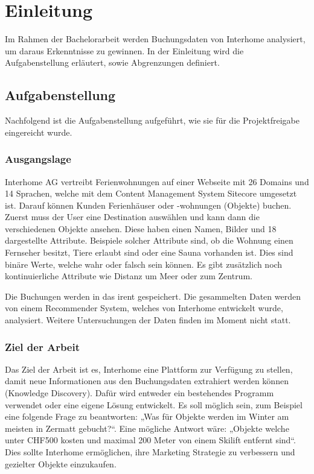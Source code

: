 
\chapter{Einleitung}
\label{sec:vorgehen}
Im Rahmen der Bachelorarbeit werden Buchungsdaten von Interhome analysiert, um daraus Erkenntnisse zu gewinnen. In der Einleitung wird die Aufgabenstellung erläutert, sowie Abgrenzungen definiert.
 
\section{Aufgabenstellung}
Nachfolgend ist die Aufgabenstellung aufgeführt, wie sie für die Projektfreigabe eingereicht wurde.

\subsection{Ausgangslage}
Interhome AG vertreibt Ferienwohnungen auf einer Webseite mit 26 Domains und 14 Sprachen, welche mit dem Content Management System Sitecore umgesetzt ist. Darauf können Kunden Ferienhäuser oder -wohnungen (Objekte) buchen. Zuerst muss der User eine Destination auswählen und kann dann die verschiedenen Objekte ansehen. Diese haben einen Namen, Bilder und 18 dargestellte Attribute. Beispiele solcher Attribute sind, ob die Wohnung einen Fernseher besitzt, Tiere erlaubt sind oder eine Sauna vorhanden ist. Dies sind binäre Werte, welche wahr oder falsch sein können. Es gibt zusätzlich noch kontinuierliche Attribute wie Distanz um Meer oder zum Zentrum.

Die Buchungen werden in das \gls{irent} gespeichert. Die gesammelten Daten werden von einem Recommender System, welches von Interhome entwickelt wurde, analysiert. Weitere Untersuchungen der Daten finden im Moment nicht statt.

\subsection{Ziel der Arbeit}
\label{sec:einletung:ziel}
Das Ziel der Arbeit ist es, Interhome eine Plattform zur Verfügung zu stellen, damit neue Informationen aus den Buchungsdaten extrahiert werden können (Knowledge Discovery). Dafür wird entweder ein bestehendes Programm verwendet oder eine eigene Lösung entwickelt. Es soll möglich sein, zum Beispiel eine folgende Frage zu beantworten: „Was für Objekte werden im Winter am meisten in Zermatt gebucht?“. Eine mögliche Antwort wäre: „Objekte welche unter CHF500 kosten und maximal 200 Meter von einem Skilift entfernt sind“.
Dies sollte Interhome ermöglichen, ihre Marketing Strategie zu verbessern und gezielter Objekte einzukaufen.

